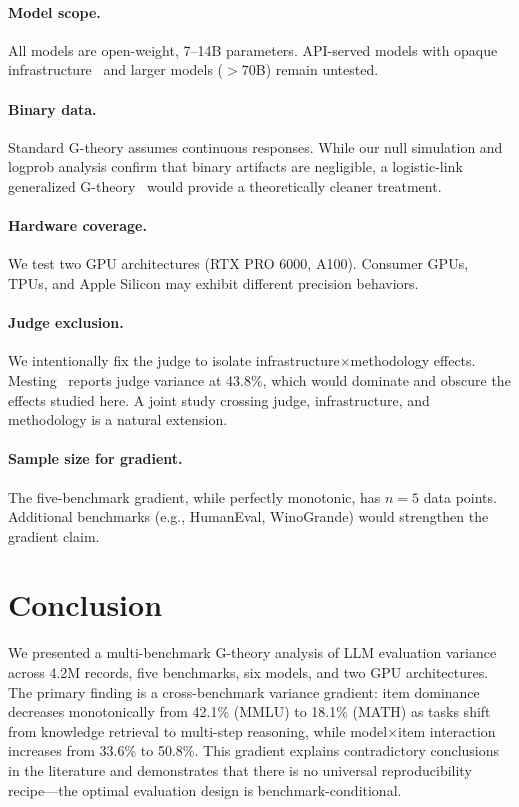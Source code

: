 \documentclass[11pt,a4paper]{article}
\begin{document}
\paragraph{Model scope.}
All models are open-weight, 7--14B parameters.
API-served models with opaque infrastructure~\citep{mesting2026} and larger models ($>$70B) remain untested.

\paragraph{Binary data.}
Standard G-theory assumes continuous responses.
While our null simulation and logprob analysis confirm that binary artifacts are negligible, a logistic-link generalized G-theory~\citep{jiang2017,mushquash2006} would provide a theoretically cleaner treatment.

\paragraph{Hardware coverage.}
We test two GPU architectures (RTX PRO 6000, A100).
Consumer GPUs, TPUs, and Apple Silicon may exhibit different precision behaviors.

\paragraph{Judge exclusion.}
We intentionally fix the judge to isolate infrastructure$\times$methodology effects.
Mesting~\citeyearpar{mesting2026} reports judge variance at 43.8\%, which would dominate and obscure the effects studied here.
A joint study crossing judge, infrastructure, and methodology is a natural extension.

\paragraph{Sample size for gradient.}
The five-benchmark gradient, while perfectly monotonic, has $n=5$ data points.
Additional benchmarks (e.g., HumanEval, WinoGrande) would strengthen the gradient claim.

\section{Conclusion}

We presented a multi-benchmark G-theory analysis of LLM evaluation variance across 4.2M records, five benchmarks, six models, and two GPU architectures.
The primary finding is a cross-benchmark variance gradient: item dominance decreases monotonically from 42.1\% (MMLU) to 18.1\% (MATH) as tasks shift from knowledge retrieval to multi-step reasoning, while model$\times$item interaction increases from 33.6\% to 50.8\%.
This gradient explains contradictory conclusions in the literature and demonstrates that there is no universal reproducibility recipe---the optimal evaluation design is benchmark-conditional.
\end{document}
